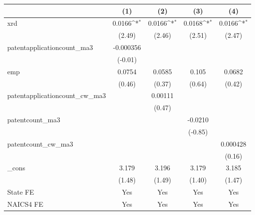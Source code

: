 {
\def\sym#1{\ifmmode^{#1}\else\(^{#1}\)\fi}
\begin{tabular}{l*{4}{c}}
\hline\hline
            &\multicolumn{1}{c}{(1)}         &\multicolumn{1}{c}{(2)}         &\multicolumn{1}{c}{(3)}         &\multicolumn{1}{c}{(4)}         \\
\hline
xrd         &      0.0166\sym{*}  &      0.0166\sym{*}  &      0.0168\sym{*}  &      0.0166\sym{*}  \\
            &      (2.49)         &      (2.46)         &      (2.51)         &      (2.47)         \\
[1em]
patentapplicationcount\_ma3&   -0.000356         &                     &                     &                     \\
            &     (-0.01)         &                     &                     &                     \\
[1em]
emp         &      0.0754         &      0.0585         &       0.105         &      0.0682         \\
            &      (0.46)         &      (0.37)         &      (0.64)         &      (0.42)         \\
[1em]
patentapplicationcount\_cw\_ma3&                     &     0.00111         &                     &                     \\
            &                     &      (0.47)         &                     &                     \\
[1em]
patentcount\_ma3&                     &                     &     -0.0210         &                     \\
            &                     &                     &     (-0.85)         &                     \\
[1em]
patentcount\_cw\_ma3&                     &                     &                     &    0.000428         \\
            &                     &                     &                     &      (0.16)         \\
[1em]
\_cons      &       3.179         &       3.196         &       3.179         &       3.185         \\
            &      (1.48)         &      (1.49)         &      (1.40)         &      (1.47)         \\
[1em]
State FE    &         Yes         &         Yes         &         Yes         &         Yes         \\
[1em]
NAICS4 FE   &         Yes         &         Yes         &         Yes         &         Yes         \\

\end{tabular}}

